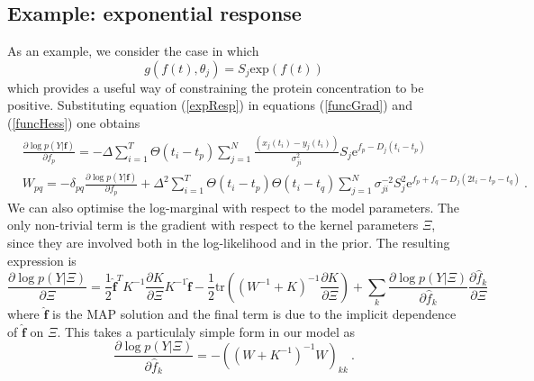 \documentclass[english]{article}
\begin{document}
\subsection{Example: exponential response}
As an example, we consider the case in which 
\begin{equation}
g\left(f\left(t\right),\theta_j\right)=S_j\textrm{exp}\left(f\left(t\right)
\right)
\label{expResp}\end{equation}
which provides a useful way of constraining the protein concentration to be 
positive.
Substituting equation (\ref{expResp}) in equations (\ref{funcGrad}) and 
(\ref{funcHess}) one obtains
\begin{equation*}\begin{split}
&\frac{\partial\log p(Y|\bm f)}{\partial f_p} = -\Delta\sum_{i=1}^T \Theta\left(t_i - t_p\right)\sum_{j=1}^N 
\frac{\left(x_j(t_i) - y_{j}\left(t_i\right)\right)}{\sigma^2_{ji} }S_j \mathrm{e}^{f_p-D_j(t_i-t_p)} \\
&W_{pq} = -\delta_{pq}\frac{\partial\log p(Y|\bm f)}{\partial f_p} + \Delta^2\sum_{i=1}^T 
\Theta\left(t_i-t_p\right)\Theta\left(t_i-t_q\right)\sum_{j=1}^N \sigma_{ji}^{-2} 
S_j^2 \mathrm{e}^{f_p+f_q-D_j(2t_i-t_p-t_q)} \ .
\end{split}\end{equation*}
We can also optimise the log-marginal with respect to the model parameters.
The only non-trivial term is the gradient with respect to the kernel parameters
$\Xi$, since they are involved both in the log-likelihood and in the prior.
The resulting expression is \cite{Rasmussen:book05} 
\begin{equation*}
\frac{\partial \log p(Y|\Xi)}{\partial \Xi} = 
\mbox{$\frac{1}{2}$}\hat{\bm f}^T K^{-1}\frac{\partial K}{\partial \Xi} K^{-1}\hat{\bm f} - 
\mbox{$\frac{1}{2}$}\mbox{tr}\left((W^{-1}+K)^{-1}\frac{\partial
  K}{\partial \Xi}\right) + \sum_k \frac{\partial \log p(Y|\Xi)}{\partial \hat{f}_k}\frac{\partial\hat{f}_k}{\partial \Xi}
\end{equation*}
where $\hat{\bm f}$ is the MAP solution and the final term is due to the 
implicit dependence of $\hat{\bm f}$ on $\Xi$. This takes a particulaly 
simple form in our model as
\[
\frac{\partial \log p(Y|\Xi)}{\partial \hat{f}_k} =
-((W+K^{-1})^{-1}W)_{kk} \ .
\]
\end{document}
